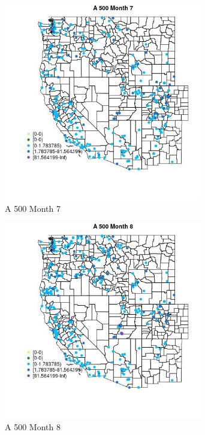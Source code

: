 \begin{figure} 
\centering  
\includegraphics[width=0.77\textwidth]{Code_Outputs/Report_ML_input_PM25_Step4_part_e_de_duplicated_aveswNAs_MapObsMo7A_500.jpg} 
\caption{\label{fig:Report_ML_input_PM25_Step4_part_e_de_duplicated_aveswNAsMapObsMo7A_500}A 500 Month 7} 
\end{figure} 
 

\begin{figure} 
\centering  
\includegraphics[width=0.77\textwidth]{Code_Outputs/Report_ML_input_PM25_Step4_part_e_de_duplicated_aveswNAs_MapObsMo8A_500.jpg} 
\caption{\label{fig:Report_ML_input_PM25_Step4_part_e_de_duplicated_aveswNAsMapObsMo8A_500}A 500 Month 8} 
\end{figure} 
 


